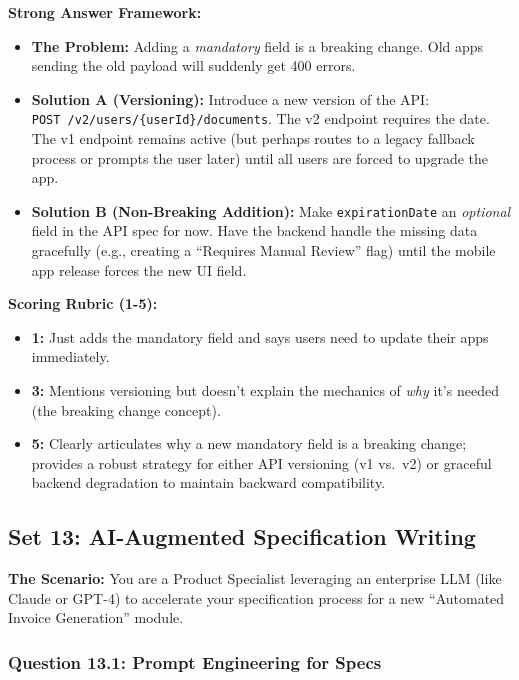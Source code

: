 \documentclass[
  11pt,
  openany,
  oneside]{book}
\providecommand{\tightlist}{%
  \setlength{\itemsep}{0pt}\setlength{\parskip}{0pt}}
\begin{document}
\textbf{Strong Answer Framework:}

\begin{itemize}
\tightlist
\item
  \textbf{The Problem:} Adding a \emph{mandatory} field is a breaking
  change. Old apps sending the old payload will suddenly get 400 errors.
\item
  \textbf{Solution A (Versioning):} Introduce a new version of the API:
  \texttt{POST\ /v2/users/\{userId\}/documents}. The v2 endpoint
  requires the date. The v1 endpoint remains active (but perhaps routes
  to a legacy fallback process or prompts the user later) until all
  users are forced to upgrade the app.
\item
  \textbf{Solution B (Non-Breaking Addition):} Make
  \texttt{expirationDate} an \emph{optional} field in the API spec for
  now. Have the backend handle the missing data gracefully (e.g.,
  creating a ``Requires Manual Review'' flag) until the mobile app
  release forces the new UI field.
\end{itemize}

\textbf{Scoring Rubric (1-5):}

\begin{itemize}
\tightlist
\item
  \textbf{1:} Just adds the mandatory field and says users need to
  update their apps immediately.
\item
  \textbf{3:} Mentions versioning but doesn't explain the mechanics of
  \emph{why} it's needed (the breaking change concept).
\item
  \textbf{5:} Clearly articulates why a new mandatory field is a
  breaking change; provides a robust strategy for either API versioning
  (v1 vs.~v2) or graceful backend degradation to maintain backward
  compatibility.
\end{itemize}

\bigskip

\subsection{Set 13: AI-Augmented Specification
Writing}\label{set-13-ai-augmented-specification-writing}

\textbf{The Scenario:} You are a Product Specialist leveraging an
enterprise LLM (like Claude or GPT-4) to accelerate your specification
process for a new ``Automated Invoice Generation'' module.

\subsubsection{Question 13.1: Prompt Engineering for
Specs}\label{question-13.1-prompt-engineering-for-specs}
\end{document}
